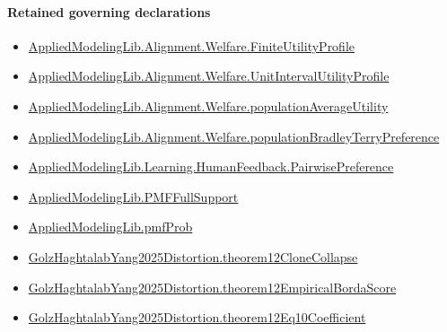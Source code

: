 \documentclass[10pt]{article}
\begin{document}
\paragraph{Retained governing declarations}
\begin{itemize}\raggedright
\item \hyperlink{library-prerequisite-56c0734f8877ddbe}{Applied\allowbreak{}Modeling\allowbreak{}Lib.\allowbreak{}Alignment.\allowbreak{}Welfare.\allowbreak{}Finite\allowbreak{}Utility\allowbreak{}Profile}
\item \hyperlink{library-prerequisite-cbe8afa0d6d1ba78}{Applied\allowbreak{}Modeling\allowbreak{}Lib.\allowbreak{}Alignment.\allowbreak{}Welfare.\allowbreak{}Unit\allowbreak{}Interval\allowbreak{}Utility\allowbreak{}Profile}
\item \hyperlink{library-prerequisite-15f4b442749deab2}{Applied\allowbreak{}Modeling\allowbreak{}Lib.\allowbreak{}Alignment.\allowbreak{}Welfare.\allowbreak{}population\allowbreak{}Average\allowbreak{}Utility}
\item \hyperlink{library-prerequisite-cf06d15d7f8b7c31}{Applied\allowbreak{}Modeling\allowbreak{}Lib.\allowbreak{}Alignment.\allowbreak{}Welfare.\allowbreak{}population\allowbreak{}Bradley\allowbreak{}Terry\allowbreak{}Preference}
\item \hyperlink{library-prerequisite-7e2db20cf087d9ba}{Applied\allowbreak{}Modeling\allowbreak{}Lib.\allowbreak{}Learning.\allowbreak{}Human\allowbreak{}Feedback.\allowbreak{}Pairwise\allowbreak{}Preference}
\item \hyperlink{library-prerequisite-268c959ee7d2d148}{Applied\allowbreak{}Modeling\allowbreak{}Lib.\allowbreak{}PMF\allowbreak{}Full\allowbreak{}Support}
\item \hyperlink{governing-declaration-9c38d53b9d664221}{Applied\allowbreak{}Modeling\allowbreak{}Lib.\allowbreak{}pmf\allowbreak{}Prob}
\item \hyperlink{governing-declaration-ec899679d7cb6165}{Golz\allowbreak{}Haghtalab\allowbreak{}Yang2025\allowbreak{}Distortion.\allowbreak{}theorem12\allowbreak{}Clone\allowbreak{}Collapse}
\item \hyperlink{governing-declaration-b2a8d113fc3130c2}{Golz\allowbreak{}Haghtalab\allowbreak{}Yang2025\allowbreak{}Distortion.\allowbreak{}theorem12\allowbreak{}Empirical\allowbreak{}Borda\allowbreak{}Score}
\item \hyperlink{governing-declaration-aec5a9f50c9e967a}{Golz\allowbreak{}Haghtalab\allowbreak{}Yang2025\allowbreak{}Distortion.\allowbreak{}theorem12\allowbreak{}Eq10\allowbreak{}Coefficient}

\end{itemize}
\end{document}
